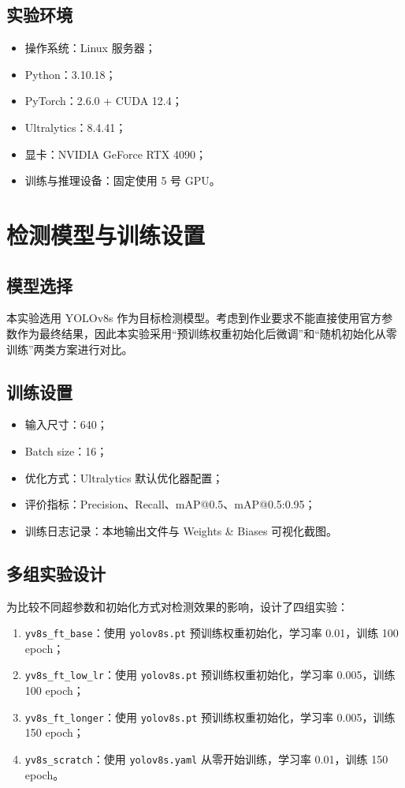 \documentclass[UTF8,a4paper,12pt,fontset=fandol]{ctexart}
\begin{document}
\subsection{实验环境}
\begin{itemize}
    \item 操作系统：Linux 服务器；
    \item Python：3.10.18；
    \item PyTorch：2.6.0 + CUDA 12.4；
    \item Ultralytics：8.4.41；
    \item 显卡：NVIDIA GeForce RTX 4090；
    \item 训练与推理设备：固定使用 5 号 GPU。
\end{itemize}

\section{检测模型与训练设置}

\subsection{模型选择}
本实验选用 YOLOv8s 作为目标检测模型。考虑到作业要求不能直接使用官方参数作为最终结果，因此本实验采用“预训练权重初始化后微调”和“随机初始化从零训练”两类方案进行对比。

\subsection{训练设置}
\begin{itemize}
    \item 输入尺寸：640；
    \item Batch size：16；
    \item 优化方式：Ultralytics 默认优化器配置；
    \item 评价指标：Precision、Recall、mAP@0.5、mAP@0.5:0.95；
    \item 训练日志记录：本地输出文件与 Weights \& Biases 可视化截图。
\end{itemize}

\subsection{多组实验设计}
为比较不同超参数和初始化方式对检测效果的影响，设计了四组实验：
\begin{enumerate}
    \item \texttt{yv8s\_ft\_base}：使用 \texttt{yolov8s.pt} 预训练权重初始化，学习率 0.01，训练 100 epoch；
    \item \texttt{yv8s\_ft\_low\_lr}：使用 \texttt{yolov8s.pt} 预训练权重初始化，学习率 0.005，训练 100 epoch；
    \item \texttt{yv8s\_ft\_longer}：使用 \texttt{yolov8s.pt} 预训练权重初始化，学习率 0.005，训练 150 epoch；
    \item \texttt{yv8s\_scratch}：使用 \texttt{yolov8s.yaml} 从零开始训练，学习率 0.01，训练 150 epoch。
\end{enumerate}
\end{document}
